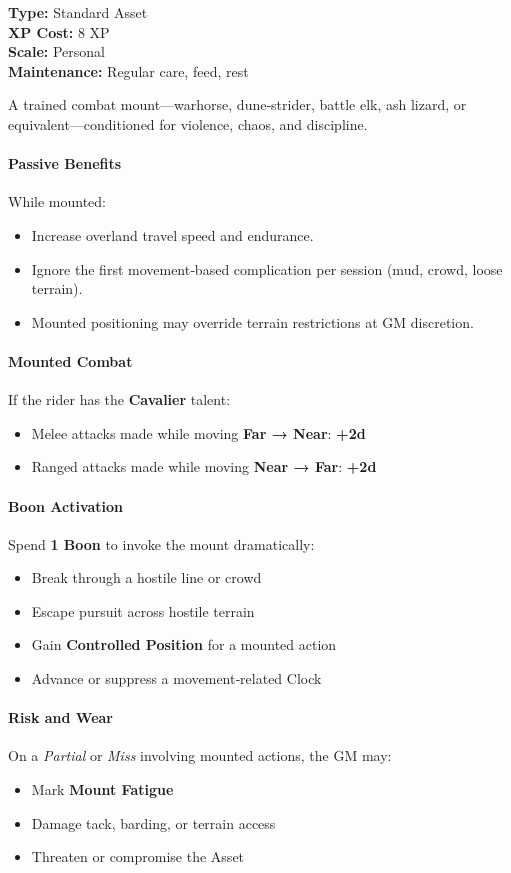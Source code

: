 \textbf{Type:} Standard Asset \\
\textbf{XP Cost:} 8 XP \\
\textbf{Scale:} Personal \\
\textbf{Maintenance:} Regular care, feed, rest

A trained combat mount—warhorse, dune‑strider, battle elk, ash lizard, or equivalent—conditioned for violence, chaos, and discipline.

\paragraph{Passive Benefits}
While mounted:
\begin{itemize}
  \item Increase overland travel speed and endurance.
  \item Ignore the first movement‑based complication per session (mud, crowd, loose terrain).
  \item Mounted positioning may override terrain restrictions at GM discretion.
\end{itemize}

\paragraph{Mounted Combat}
If the rider has the \textbf{Cavalier} talent:
\begin{itemize}
  \item Melee attacks made while moving \textbf{Far → Near}: \textbf{+2d}
  \item Ranged attacks made while moving \textbf{Near → Far}: \textbf{+2d}
\end{itemize}

\paragraph{Boon Activation}
Spend \textbf{1 Boon} to invoke the mount dramatically:
\begin{itemize}
  \item Break through a hostile line or crowd
  \item Escape pursuit across hostile terrain
  \item Gain \textbf{Controlled Position} for a mounted action
  \item Advance or suppress a movement‑related Clock
\end{itemize}

\paragraph{Risk and Wear}
On a \emph{Partial} or \emph{Miss} involving mounted actions, the GM may:
\begin{itemize}
  \item Mark \textbf{Mount Fatigue}
  \item Damage tack, barding, or terrain access
  \item Threaten or compromise the Asset
\end{itemize}

